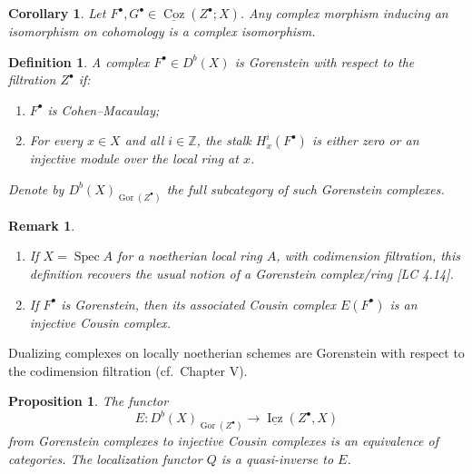 \documentclass[12pt]{book}
\theoremstyle{plain}
\newtheorem{proposition}{Proposition}[section]
\newtheorem{definition}{Definition}[section]
\newtheorem{corollary}{Corollary}[section]
\newtheorem{remark}{Remark}[section]
\begin{document}
\setcounter{page}{248}
\begin{corollary}
Let \(F^\bullet,G^\bullet\in\underline{\operatorname{Coz}}(Z^\bullet;X)\). Any complex morphism inducing an isomorphism on cohomology is a complex isomorphism.
\end{corollary}

\begin{definition}
A complex \(F^\bullet\in D^b(X)\) is \textit{Gorenstein with respect to the filtration \(Z^\bullet\)} if:
\begin{enumerate}
\item \(F^\bullet\) is Cohen--Macaulay;
\item For every \(x\in X\) and all \(i\in\mathbb{Z}\), the stalk \(H_x^i(F^\bullet)\) is either zero or an injective module over the local ring at \(x\).
\end{enumerate}
Denote by \(D^b(X)_{\operatorname{Gor}(Z^\bullet)}\) the full subcategory of such Gorenstein complexes.
\end{definition}

\setcounter{page}{249}
\begin{remark}
\begin{enumerate}
\item If \(X=\operatorname{Spec}A\) for a noetherian local ring \(A\), with codimension filtration, this definition recovers the usual notion of a Gorenstein complex/ring [LC 4.14].
\item If \(F^\bullet\) is Gorenstein, then its associated Cousin complex \(E(F^\bullet)\) is an injective Cousin complex.
\end{enumerate}
\end{remark}

\begin{example}
Dualizing complexes on locally noetherian schemes are Gorenstein with respect to the codimension filtration (cf.\ Chapter V).
\end{example}

\setcounter{page}{250}
\begin{proposition}
The functor
\[
E\colon D^b(X)_{\operatorname{Gor}(Z^\bullet)} \to \underline{\operatorname{Icz}}(Z^\bullet,X)
\]
from Gorenstein complexes to injective Cousin complexes is an equivalence of categories. The localization functor \(Q\) is a quasi-inverse to \(E\).
\end{proposition}
\end{document}
